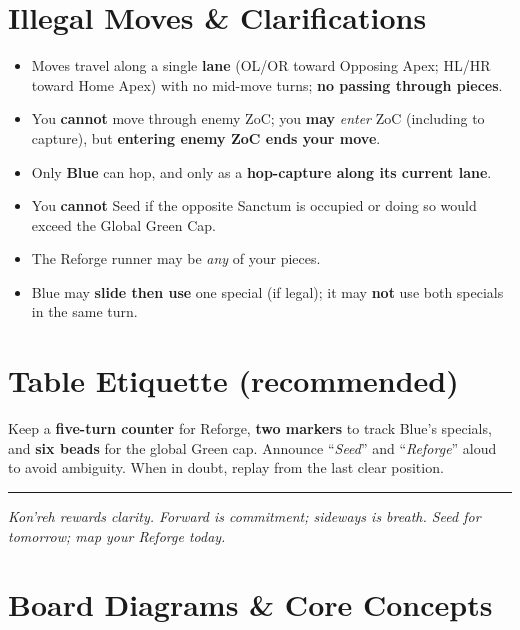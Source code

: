 \documentclass[11pt]{article}
\begin{document}
\section{Illegal Moves \& Clarifications}
\label{sec:clarifications}

\begin{itemize}
  \item Moves travel along a single \textbf{lane} (OL/OR toward Opposing Apex; HL/HR toward Home Apex) with no mid-move turns; \textbf{no passing through pieces}.
  \item You \textbf{cannot} move through enemy ZoC; you \textbf{may} \emph{enter} ZoC (including to capture), but \textbf{entering enemy ZoC ends your move}.
  \item Only \textbf{Blue} can hop, and only as a \textbf{hop-capture along its current lane}.
  \item You \textbf{cannot} Seed if the opposite Sanctum is occupied or doing so would exceed the Global Green Cap.
  \item The Reforge runner may be \emph{any} of your pieces.
  \item Blue may \textbf{slide then use} one special (if legal); it may \textbf{not} use both specials in the same turn.
\end{itemize}

\section{Table Etiquette (recommended)}
\label{sec:etiquette}


Keep a \textbf{five-turn counter} for Reforge, \textbf{two markers} to track Blue’s specials, and \textbf{six beads} for the global Green cap. Announce “\textit{Seed}” and “\textit{Reforge}” aloud to avoid ambiguity. When in doubt, replay from the last clear position.

\vfill
\hrule
\small
\textit{Kon'reh rewards clarity. Forward is commitment; sideways is breath. Seed for tomorrow; map your Reforge today.}
\clearpage

\FloatBarrier
\needspace{0.80\textheight}


\section{Board Diagrams \& Core Concepts}
\vspace{-0.4\baselineskip}
\end{document}
